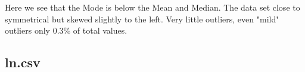 \documentclass[10pt]{article}
\begin{document}
\par
{}%
\hfill
{}%
\par
Here we see that the Mode is below the Mean and Median. The data set close to symmetrical but skewed slightly to the left. Very little outliers, even "mild" outliers only 0.3\% of total values. \subsection*{ln.csv}
\end{document}
